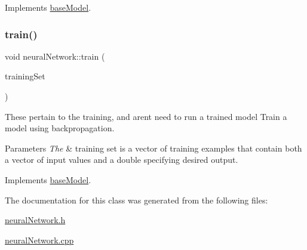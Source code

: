 Implements \hyperlink{classbase_model_a07d92b944728ff2b3339d6bceaecb6a3}{base\+Model}.

\mbox{\label{classneural_network_aae35def98392b0d0a51f2c82afc48efc}} 
\subsubsection{\texorpdfstring{train()}{train()}}
{\footnotesize\ttfamily void neural\+Network\+::train (\begin{DoxyParamCaption}\item[{std\+::vector$<$ \hyperlink{structtraining_example}{training\+Example} $>$}]{training\+Set }\end{DoxyParamCaption})\hspace{0.3cm}{\ttfamily [virtual]}}

These pertain to the training, and aren\textquotesingle{}t need to run a trained model Train a model using backpropagation.


\begin{DoxyParams}{Parameters}
{\em The} & training set is a vector of training examples that contain both a vector of input values and a double specifying desired output. \\
\hline
\end{DoxyParams}


Implements \hyperlink{classbase_model_aed9192d6c0f17a1816a55b077baf2523}{base\+Model}.



The documentation for this class was generated from the following files\+:\begin{DoxyCompactItemize}
\item 
\hyperlink{neural_network_8h}{neural\+Network.\+h}\item 
\hyperlink{neural_network_8cpp}{neural\+Network.\+cpp}\end{DoxyCompactItemize}
